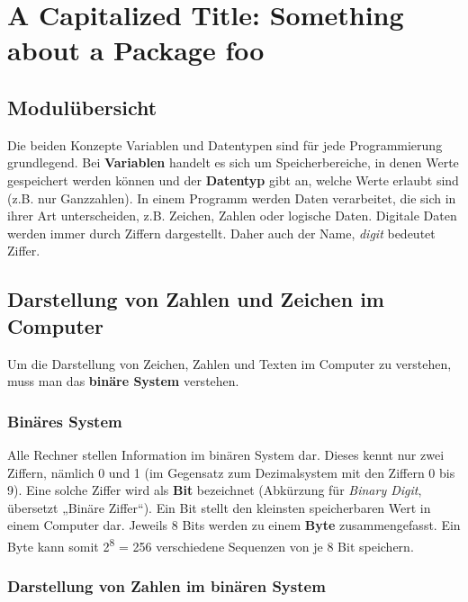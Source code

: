 \documentclass[10pt,paper=17cm:22cm, twoside=true, DIV=14]{scrbook}
\begin{document}
\clearpage \begingroup \let\clearpage\relax \let\cleardoublepage\relax \chapter{ A Capitalized Title: Something about a Package foo } \endgroup 

\section{Modulübersicht}\label{modulubersicht-1}

Die beiden Konzepte Variablen und Datentypen sind für jede
Programmierung grundlegend. Bei \textbf{Variablen} handelt es sich um
Speicherbereiche, in denen Werte gespeichert werden können und der
\textbf{Datentyp} gibt an, welche Werte erlaubt sind (z.B. nur
Ganzzahlen). In einem Programm werden Daten verarbeitet, die sich in
ihrer Art unterscheiden, z.B. Zeichen, Zahlen oder logische Daten.
Digitale Daten werden immer durch Ziffern dargestellt. Daher auch der
Name, \emph{digit} bedeutet Ziffer.

\section{Darstellung von Zahlen und Zeichen im
Computer}\label{darstellung-von-zahlen-und-zeichen-im-computer-2}

Um die Darstellung von Zeichen, Zahlen und Texten im Computer zu
verstehen, muss man das \textbf{binäre System} verstehen.

\subsection{Binäres System}\label{binares-system-2}

Alle Rechner stellen Information im binären System dar. Dieses kennt nur
zwei Ziffern, nämlich 0 und 1 (im Gegensatz zum Dezimalsystem mit den
Ziffern 0 bis 9). Eine solche Ziffer wird als \textbf{Bit} bezeichnet
(Abkürzung für \emph{Binary Digit}, übersetzt „Binäre Ziffer``). Ein Bit
stellt den kleinsten speicherbaren Wert in einem Computer dar. Jeweils 8
Bits werden zu einem \textbf{Byte} zusammengefasst. Ein Byte kann somit
2\textsuperscript{8} = 256 verschiedene Sequenzen von je 8 Bit
speichern.

\subsection{Darstellung von Zahlen im binären
System}\label{darstellung-von-zahlen-im-binaren-system-2}
\end{document}
